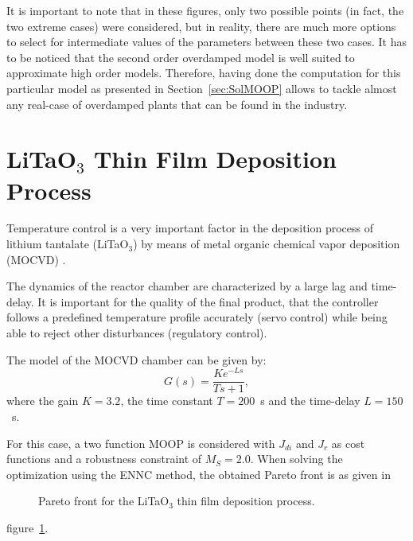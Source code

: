 It is important to note that in these figures, only two possible points (in fact, the two extreme cases) were considered, but in reality, there are much more options to select for intermediate values of the parameters between these two cases. It has to be noticed that the second order overdamped model is well suited to approximate high order models. Therefore, having done the computation for this particular model as presented in Section~\ref{sec:SolMOOP} allows to tackle almost any real-case of overdamped plants that can be found in the industry.
\section{LiTaO$_3$ Thin Film Deposition Process}
\label{sec:LiTAO3}
Temperature control is a very important factor in the deposition process of lithium tantalate (LiTaO$_3$) by means of metal organic chemical vapor deposition (MOCVD) \citep{Zhang2004}.

The dynamics of the reactor chamber are characterized by a large lag and time-delay. It is important for the quality of the final product, that the controller follows a predefined temperature profile accurately (servo control) while being able to reject other disturbances (regulatory control).

The model of the MOCVD chamber can be given by:
\begin{equation}
G(s) = \frac{K e^{-L s}}{T s+1},
\label{eq:GsLita}
\end{equation}
%
where the gain $K = 3.2$, the time constant $T = 200$~s and the time-delay $L = 150$~s.

For this case, a two function MOOP is considered with $J_{di}$ and $J_{r}$ as cost functions and a robustness constraint of $M_S = 2.0$. When solving the optimization using the ENNC method, the obtained Pareto front is as given in %
\begin{figure}[tb]
	\centering
	\caption{Pareto front for the LiTaO$_3$ thin film deposition process.}
	\label{fig:LitaPareto}
\end{figure}
%
figure~\ref{fig:LitaPareto}.

